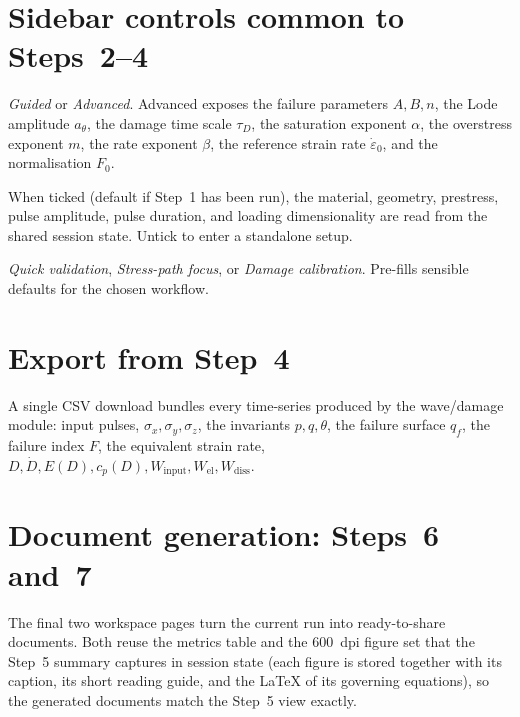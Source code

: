 \documentclass[11pt,a4paper,openany]{book}
\providecommand{\SI}[2]{\qty{#1}{#2}}
\theoremstyle{handbook}
\newcommand{\sig}{\sigma}
\newcommand{\eps}{\varepsilon}
\newcommand{\epsdot}{\dot\eps}
\begin{document}
\section{Sidebar controls common to Steps~2--4}

\begin{description}[leftmargin=2em,style=nextline]
  \item[Control level] \emph{Guided} or \emph{Advanced}. Advanced exposes
    the failure parameters $A,B,n$, the Lode amplitude $a_\theta$, the
    damage time scale $\tau_D$, the saturation exponent $\alpha$, the
    overstress exponent $m$, the rate exponent $\beta$, the reference
    strain rate $\epsdot_0$, and the normalisation $F_0$.
  \item[Use Step 1 setup] When ticked (default if Step~1 has been run),
    the material, geometry, prestress, pulse amplitude, pulse duration,
    and loading dimensionality are read from the shared session state.
    Untick to enter a standalone setup.
  \item[Analysis goal] \emph{Quick validation}, \emph{Stress-path focus},
    or \emph{Damage calibration}. Pre-fills sensible defaults for the
    chosen workflow.
\end{description}

\section{Export from Step~4}

A single CSV download bundles every time-series produced by the
wave/damage module: input pulses, $\sig_x,\sig_y,\sig_z$, the invariants
$p,q,\theta$, the failure surface $q_f$, the failure index $F$, the
equivalent strain rate, $D,\dot D,E(D),c_p(D),W_{\text{input}},
W_{\text{el}},W_{\text{diss}}$.

\section{Document generation: Steps~6 and~7}\label{sec:docgen}

The final two workspace pages turn the current run into ready-to-share
documents. Both reuse the metrics table and the \SI{600}{dpi} figure set that
the Step~5 summary captures in session state (each figure is stored together
with its caption, its short reading guide, and the \LaTeX{} of its governing
equations), so the generated documents match the Step~5 view exactly.
\end{document}
